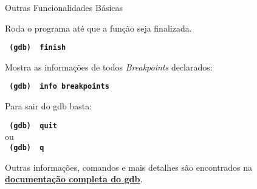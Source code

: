 \begin{frame}{Outras Funcionalidades Básicas}

    Roda o programa até que a função seja finalizada.
    
    \begin{center}
        \small
        \texttt{ \textbf{ (gdb) {\color{blue} finish} } }
    \end{center}

    Mostra as informações de todos \textit{Breakpoints} declarados:
     \begin{center}
        \small
        \texttt{ \textbf{ (gdb) {\color{blue} info breakpoints} } }
    \end{center}

    Para sair do gdb basta:
    
    \begin{center}
        \small
        \texttt{ \textbf{ (gdb) {\color{blue} quit} } }
        \\ ou \\
        \texttt{ \textbf{ (gdb) {\color{blue} q} } }
    \end{center}
    
    Outras informações, comandos e mais detalhes são encontrados na {\color{blue}\textbf{ \underline{\href{https://sourceware.org/gdb/current/onlinedocs/gdb/}{documentação completa do gdb}}}}.
    
\end{frame}
